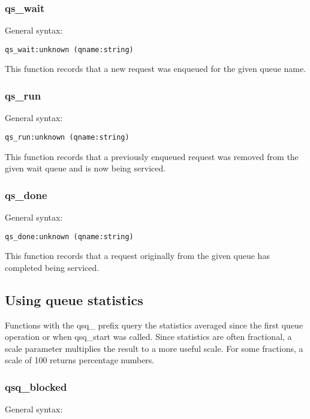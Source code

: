 \documentclass[twoside,english]{article}
\newenvironment{vindent}
{\begin{list}{}{\setlength{\listparindent}{6pt}}
\item[]}
{\end{list}}
\begin{document}
\subsubsection{qs\_wait}
General syntax:

\begin{vindent}
\begin{verbatim}
qs_wait:unknown (qname:string)
\end{verbatim}
\end{vindent}
This function records that a new request was enqueued for the given queue
name.


\subsubsection{qs\_run}
General syntax:

\begin{vindent}
\begin{verbatim}
qs_run:unknown (qname:string)
\end{verbatim}
\end{vindent}
This function records that a previously enqueued request was removed from
the given wait queue and is now being serviced.


\subsubsection{qs\_done}
General syntax:

\begin{vindent}
\begin{verbatim}
qs_done:unknown (qname:string)
\end{verbatim}
\end{vindent}
This function records that a request originally from the given queue has
completed being serviced.


\subsection{Using queue statistics}

Functions with the qsq\_ prefix query the statistics averaged since the first
queue operation or when qsq\_start was called. Since statistics are often
fractional, a scale parameter multiplies the result to a more useful scale.
For some fractions, a scale of 100 returns percentage numbers.


\subsubsection{qsq\_blocked}
General syntax:
\end{document}
